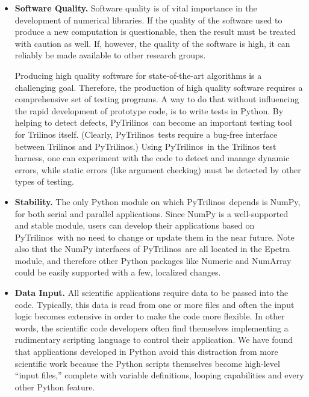 \documentclass[acmtocl]{acmtrans2m}
\newcommand{\PyTrilinos}{{PyTrilinos}}
\begin{document}
\begin{itemize}
\item {\bf Software Quality.} Software quality is of vital importance
  in the development of numerical libraries.  If the quality of the
  software used to produce a new computation is questionable, then the
  result must be treated with caution as well.  If, however, the
  quality of the software is high, it can reliably be made available
  to other research groups.

  Producing high quality software for state-of-the-art algorithms is a
  challenging goal.  Therefore, the production of high quality
  software requires a comprehensive set of testing programs.  A way to
  do that without influencing the rapid development of prototype code,
  is to write tests in Python.  By helping to detect defects,
  \PyTrilinos\ can become an important testing tool for Trilinos itself.
  (Clearly, \PyTrilinos\ tests require a bug-free interface between
  Trilinos and \PyTrilinos.) Using \PyTrilinos\ in the Trilinos test
  harness, one can experiment with the code to detect and manage
  dynamic errors, while static errors (like argument checking) must be
  detected by other types of testing.

\item {\bf Stability.} The only Python module on which \PyTrilinos\ depends is
  NumPy, for both serial and parallel applications.  Since NumPy is a
  well-supported and stable module, users can develop their applications based
  on \PyTrilinos\ with no need to change or update them in the near future. Note
  also that the NumPy interfaces of \PyTrilinos\ are all located in the Epetra
  module, and therefore other Python packages like Numeric and NumArray could be
  easily supported with a few, localized changes.

\item {\bf Data Input.} All scientific applications require data to be
  passed into the code.  Typically, this data is read from one or more
  files and often the input logic becomes extensive in order to make
  the code more flexible.  In other words, the scientific code
  developers often find themselves implementing a rudimentary
  scripting language to control their application.  We have found that
  applications developed in Python avoid this distraction from more
  scientific work because the Python scripts themselves become
  high-level ``input files,'' complete with variable definitions,
  looping capabilities and every other Python feature.

\end{itemize}
\end{document}
